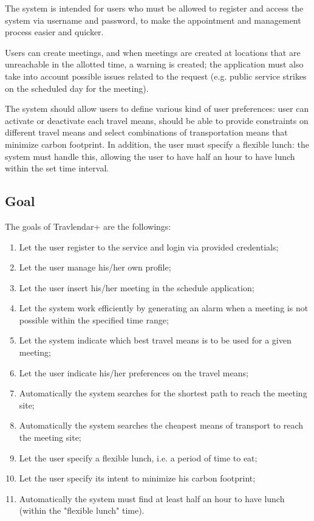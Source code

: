 \documentclass{article}
\begin{document}
	\bigskip
	The system is intended for users who must be allowed to register and access the system via username and password, to make the appointment and management process easier and quicker.

	Users can create meetings, and when meetings are created at locations that are unreachable in the allotted time, a warning is created; the application must also take into account possible issues related to the request (e.g. public service strikes on the scheduled day for the meeting). 
	
	\bigskip
	The system should allow users to define various kind of user preferences: user can activate or deactivate each travel means, should be able to provide constraints on different travel means and select combinations of transportation means that minimize carbon footprint. In addition, the user must specify a flexible lunch: the system must handle this, allowing the user to have half an hour to have lunch within the set time interval.
	
	
	\subsection{Goal}
	The goals of Travlendar+ are the followings:

	\begin{enumerate}
	\item Let the user register to the service and login via provided credentials;
	\item Let the user manage his/her own profile;
	\item Let the user insert his/her meeting in the schedule application;
	\item Let the system work efficiently by generating an alarm when a meeting is not possible within the specified time range;
	\item Let the system indicate which best travel means is to be used for a given meeting;
	\item Let the user indicate his/her preferences on the travel means;
	\item Automatically the system searches for the shortest path to reach the meeting site;
	\item Automatically the system searches the cheapest means of transport to reach the meeting site;
	\item Let the user specify a flexible lunch, i.e. a period of time to eat;
	\item Let the user specify its intent to minimize his carbon footprint;
	\item Automatically the system must find at least half an hour to have lunch (within the "flexible lunch" time).
	\end{enumerate}
\end{document}
